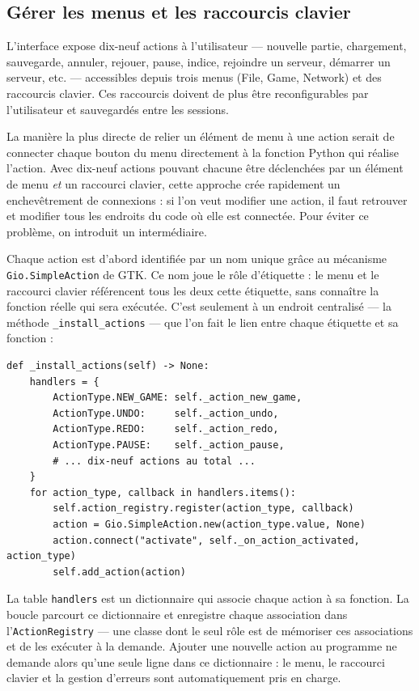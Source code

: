 \documentclass[a4paper]{article}
\begin{document}
\subsection{Gérer les menus et les raccourcis clavier}

L'interface expose dix-neuf actions à l'utilisateur — nouvelle partie,
chargement, sauvegarde, annuler, rejouer, pause, indice, rejoindre un
serveur, démarrer un serveur, etc. — accessibles depuis trois menus
(File, Game, Network) et des raccourcis clavier. Ces raccourcis doivent
de plus être reconfigurables par l'utilisateur et sauvegardés entre
les sessions.

La manière la plus directe de relier un élément de menu à une action
serait de connecter chaque bouton du menu directement à la fonction
Python qui réalise l'action. Avec dix-neuf actions pouvant chacune
être déclenchées par un élément de menu \emph{et} un raccourci clavier,
cette approche crée rapidement un enchevêtrement de connexions : si
l'on veut modifier une action, il faut retrouver et modifier tous les
endroits du code où elle est connectée. Pour éviter ce problème, on
introduit un intermédiaire.

Chaque action est d'abord identifiée par un nom unique grâce au
mécanisme \texttt{Gio.SimpleAction} de GTK. Ce nom joue le rôle
d'étiquette : le menu et le raccourci clavier référencent tous les
deux cette étiquette, sans connaître la fonction réelle qui sera
exécutée. C'est seulement à un endroit centralisé — la méthode
\texttt{\_install\_actions} — que l'on fait le lien entre chaque
étiquette et sa fonction :

\begin{lstlisting}[caption={Enregistrement unifié des actions}]
def _install_actions(self) -> None:
    handlers = {
        ActionType.NEW_GAME: self._action_new_game,
        ActionType.UNDO:     self._action_undo,
        ActionType.REDO:     self._action_redo,
        ActionType.PAUSE:    self._action_pause,
        # ... dix-neuf actions au total ...
    }
    for action_type, callback in handlers.items():
        self.action_registry.register(action_type, callback)
        action = Gio.SimpleAction.new(action_type.value, None)
        action.connect("activate", self._on_action_activated, action_type)
        self.add_action(action)
\end{lstlisting}

La table \texttt{handlers} est un dictionnaire qui associe chaque
action à sa fonction. La boucle parcourt ce dictionnaire et enregistre
chaque association dans l'\texttt{ActionRegistry} — une classe dont
le seul rôle est de mémoriser ces associations et de les exécuter à
la demande. Ajouter une nouvelle action au programme ne demande alors
qu'une seule ligne dans ce dictionnaire : le menu, le raccourci
clavier et la gestion d'erreurs sont automatiquement pris en charge.
\end{document}
